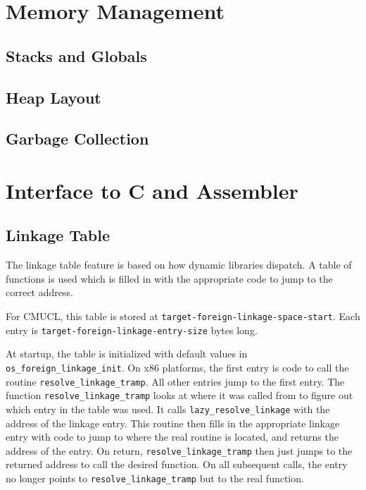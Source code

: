 \chapter{Memory Management}

\section{Stacks and Globals}

\section{Heap Layout}

\section{Garbage Collection}

\chapter{Interface to C and Assembler}


\section{Linkage Table}

The linkage table feature is based on how dynamic libraries dispatch.
A table of functions is used which is filled in with the appropriate
code to jump to the correct address.

For CMUCL, this table is stored at
\verb|target-foreign-linkage-space-start|. Each entry is
\verb|target-foreign-linkage-entry-size| bytes long.

At startup, the table is initialized with default values in
\verb|os_foreign_linkage_init|. On x86 platforms, the first entry is
code to call the routine \verb|resolve_linkage_tramp|. All other
entries jump to the first entry. The function
\verb|resolve_linkage_tramp| looks at where it was called from to
figure out which entry in the table was used. It calls
\verb|lazy_resolve_linkage| with the address of the linkage entry.
This routine then fills in the appropriate linkage entry with code to
jump to where the real routine is located, and returns the address of
the entry. On return, \verb|resolve_linkage_tramp| then just jumps to
the returned address to call the desired function. On all subsequent
calls, the entry no longer points to \verb|resolve_linkage_tramp| but
to the real function.

